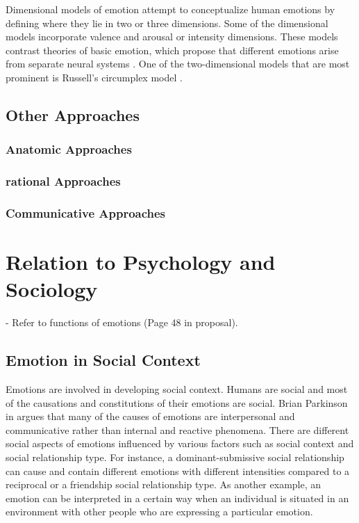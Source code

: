 \documentclass[11pt]{article}
\begin{document}
Dimensional models of emotion attempt to conceptualize human emotions by
defining where they lie in two or three dimensions. Some of the dimensional
models incorporate valence and arousal or intensity dimensions. These models
contrast theories of basic emotion, which propose that different emotions arise
from separate neural systems \cite{posner:circumplex-affect}. One of the
two-dimensional models that are most prominent is Russell's circumplex model
\cite{russell:circumplex-affect}.

\subsection{Other Approaches}

\subsubsection{Anatomic Approaches}

\subsubsection{rational Approaches}

\subsubsection{Communicative Approaches}

\section{Relation to Psychology and Sociology}

- Refer to functions of emotions (Page 48 in proposal).

\subsection{Emotion in Social Context}

Emotions are involved in developing social context. Humans are social and most
of the causations and constitutions of their emotions are social. Brian
Parkinson in \cite{parkinson:emotions-social} argues that many of the causes of
emotions are interpersonal and communicative rather than internal and reactive
phenomena. There are different social aspects of emotions influenced by various
factors such as social context and social relationship type. For instance, a
dominant-submissive social relationship can cause and contain different emotions
with different intensities compared to a reciprocal or a friendship social
relationship type. As another example, an emotion can be interpreted in a
certain way when an individual is situated in an environment with other people
who are expressing a particular emotion.
\end{document}
